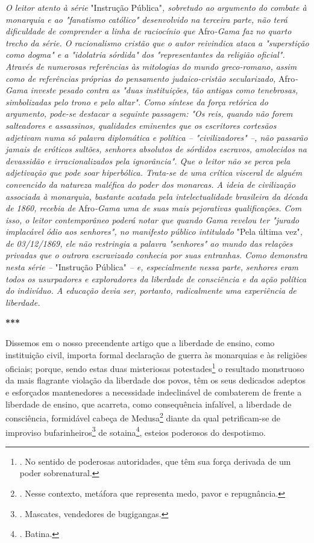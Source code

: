 \emph{O leitor atento à série} "Instrução Pública"\emph{, sobretudo ao
argumento do combate à monarquia e ao "fanatismo católico" desenvolvido
na terceira parte, não terá dificuldade de comprender a linha de
raciocínio que} Afro\emph{-Gama faz no quarto trecho da série. O
racionalismo cristão que o autor reivindica ataca a "superstição como
dogma" e a "idolatria sórdida" dos "representantes da religião oficial".
Através de numerosas referências às mitologias do mundo greco-romano,
assim como de referências próprias do pensamento judaico-cristão
secularizado,} Afro\emph{-Gama investe pesado contra as "duas
instituições, tão antigas como tenebrosas, simbolizadas pelo trono e
pelo altar". Como síntese da força retórica do argumento, pode-se
destacar a seguinte passagem: "Os reis, quando não forem salteadores e
assassinos, qualidades eminentes que os escritores cortesãos adjetivam
numa só palavra diplomática e política -- "civilizadores" --, não
passarão jamais de eróticos sultões, senhores absolutos de sórdidos
escravos, amolecidos na devassidão e irracionalizados pela ignorância".
Que o leitor não se perca pela adjetivação que pode soar hiperbólica.
Trata-se de uma crítica visceral de alguém convencido da natureza
maléfica do poder dos monarcas. A ideia de civilização associada à
monarquia, bastante acatada pela intelectualidade brasileira da década
de 1860, recebia de} Afro\emph{-Gama uma de suas mais pejorativas
qualificações. Com isso, o leitor contemporâneo poderá notar que quando
Gama revelou ter "jurado implacável ódio aos senhores", no manifesto
público intitulado} "Pela última vez"\emph{, de 03/12/1869, ele não
restringia a palavra "senhores" ao mundo das relações privadas que o
outrora escravizado conhecia por suas entranhas. Como demonstra nesta
série --} "Instrução Pública" \emph{-- e, especialmente nessa parte,
senhores eram todos os usurpadores e exploradores da liberdade de
consciência e da ação política do indivíduo. A educação devia ser,
portanto, radicalmente uma experiência de liberdade.}

\textbf{***}

Dissemos em o nosso precendente artigo que a liberdade de ensino, como
instituição civil, importa formal declaração de guerra às monarquias e
às religiões oficiais; porque, sendo estas duas misteriosas
potestades\footnote{. No sentido de poderosas autoridades, que têm sua
  força derivada de um poder sobrenatural.} o resultado monstruoso da
mais flagrante violação da liberdade dos povos, têm os seus dedicados
adeptos e esforçados mantenedores a necessidade indeclinável de
combaterem de frente a liberdade de ensino, que acarreta, como
consequência infalível, a liberdade de consciência, formidável cabeça de
Medusa\footnote{. Nesse contexto, metáfora que representa medo, pavor e
  repugnância.} diante da qual petrificam-se de improviso
bufarinheiros\footnote{. Mascates, vendedores de bugigangas.} de
sotaina\footnote{. Batina.}, esteios poderosos do despotismo.

